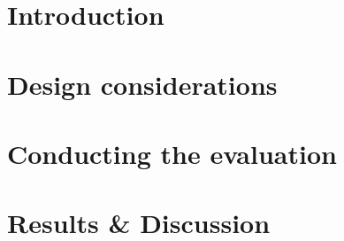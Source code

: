 \chapter{Introduction}
\chapter{Design considerations}
\chapter{Conducting the evaluation}
\chapter{Results \& Discussion}